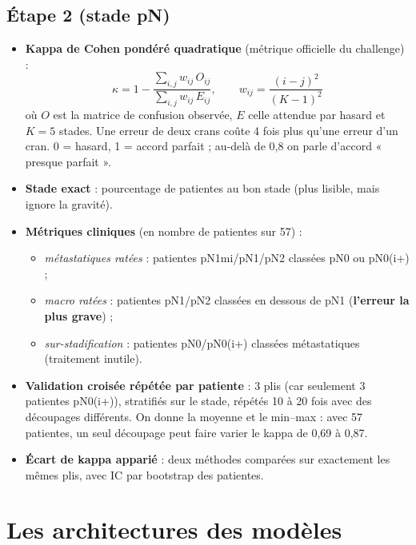 \documentclass[11pt,a4paper]{article}
\begin{document}
\subsection{Étape 2 (stade pN)}
\begin{itemize}
  \item \textbf{Kappa de Cohen pondéré quadratique} (métrique officielle du challenge) :
  \[
     \kappa = 1 - \frac{\sum_{i,j} w_{ij}\, O_{ij}}{\sum_{i,j} w_{ij}\, E_{ij}}, \qquad w_{ij} = \frac{(i-j)^2}{(K-1)^2}
  \]
  où $O$ est la matrice de confusion observée, $E$ celle attendue par hasard et $K=5$ stades. Une erreur de deux crans
  coûte 4 fois plus qu'une erreur d'un cran. 0 = hasard, 1 = accord parfait ; au-delà de 0,8 on parle d'accord « presque parfait ».
  \item \textbf{Stade exact} : pourcentage de patientes au bon stade (plus lisible, mais ignore la gravité).
  \item \textbf{Métriques cliniques} (en nombre de patientes sur 57) :
    \begin{itemize}
      \item \emph{métastatiques ratées} : patientes pN1mi/pN1/pN2 classées pN0 ou pN0(i+) ;
      \item \emph{macro ratées} : patientes pN1/pN2 classées en dessous de pN1 (\textbf{l'erreur la plus grave}) ;
      \item \emph{sur-stadification} : patientes pN0/pN0(i+) classées métastatiques (traitement inutile).
    \end{itemize}
  \item \textbf{Validation croisée répétée par patiente} : 3 plis (car seulement 3 patientes pN0(i+)), stratifiés sur le stade,
        répétés 10 à 20 fois avec des découpages différents. On donne la moyenne et le min–max : avec 57 patientes,
        un seul découpage peut faire varier le kappa de 0,69 à 0,87.
  \item \textbf{Écart de kappa apparié} : deux méthodes comparées sur exactement les mêmes plis, avec IC par bootstrap des patientes.
\end{itemize}

\section{Les architectures des modèles}
\end{document}
